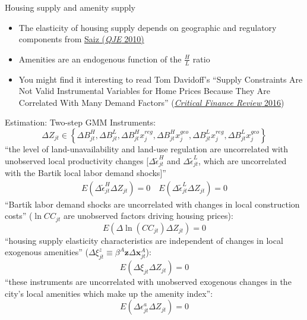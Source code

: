 \documentclass[10pt,notes=hide]{beamer}
\begin{document}
\begin{frame}{Housing supply and amenity supply}
\begin{itemize}
	\item The elasticity of housing supply depends on geographic and regulatory components from \href{https://doi.org/10.1162/qjec.2010.125.3.1253}{Saiz (\textit{QJE} 2010)}
	\item Amenities are an endogenous function of the $\frac{H}{L}$ ratio
	\item You might find it interesting to read Tom Davidoff's ``Supply Constraints Are Not Valid Instrumental Variables for Home Prices Because They Are Correlated With Many Demand Factors'' (\href{https://www.nowpublishers.com/article/Details/CFR-0037}{\textit{Critical Finance Review} 2016})
\end{itemize}
\end{frame}
\begin{frame}[plain]{Estimation: Two-step GMM}
{\small
Instruments:
\begin{equation*}
\Delta Z_{jt} \in \left\{
\Delta B^{H}_{jt}, 
\Delta B^{L}_{jt}, 
\Delta B^{H}_{jt} x^{reg}_{j}, 
\Delta B^{H}_{jt} x^{geo}_{j}, 
\Delta B^{L}_{jt} x^{reg}_{j}, 
\Delta B^{L}_{jt} x^{geo}_{j}
\right\}
\end{equation*}
``the level of land-unavailability and land-use regulation are uncorrelated with unobserved local productivity changes [$\Delta \tilde{\epsilon}_{jt}^{H}$ and $\Delta \tilde{\epsilon}_{jt}^{L}$, which are uncorrelated with the Bartik local labor demand shocks]''
\begin{align*}
E \left(\Delta \tilde{\epsilon}_{jt}^{H} \Delta Z_{jt}\right) = 0 
\quad
E \left(\Delta \tilde{\epsilon}_{jt}^{L} \Delta Z_{jt}\right) = 0 
\end{align*}
``Bartik labor demand shocks are uncorrelated with changes in local construction costs'' ($\ln CC_{jt}$ are unobserved factors driving housing prices):
$$
E\left(\Delta \ln(CC_{jt}) \Delta Z_{jt}\right) = 0
$$
``housing supply elasticity characteristics are independent of changes in local exogenous amenities'' ($\Delta \xi^z_{jt} \equiv \beta^A \mathbf{z}\Delta\mathbf{x}_{jt}^{A}$):
$$
E\left(\Delta \xi_{jt} \Delta Z_{jt}\right) = 0
$$
``these instruments are uncorrelated with unobserved exogenous changes
in the city’s local amenities which make up the amenity index'':
$$
E\left(\Delta \epsilon_{jt}^{a} \Delta Z_{jt}\right) = 0
$$
}
\end{frame}
\end{document}
